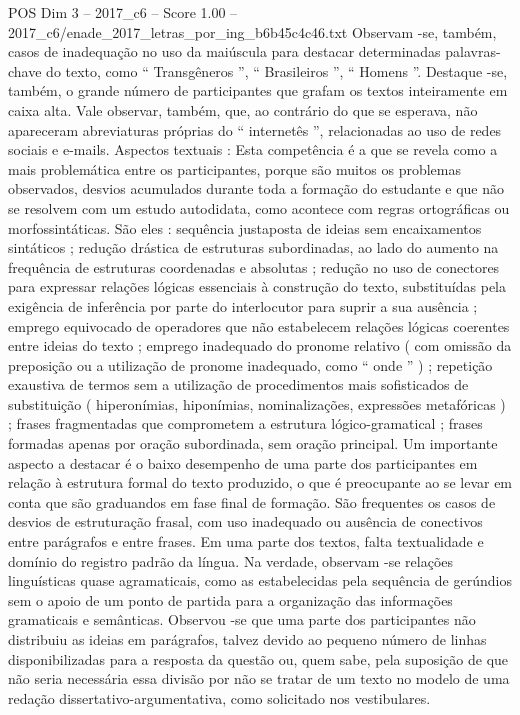 \begin{textsample}{POS Dim 3 – 2017\_c6 – Score 1.00 – 2017\_c6/enade\_2017\_letras\_por\_ing\_b6b45c4c46.txt}
Observam -se, também, casos de inadequação no uso da maiúscula para destacar determinadas palavras-chave do texto, como “ Transgêneros ”, “ Brasileiros ”, “ Homens ”.
Destaque -se, também, o grande número de participantes que grafam os textos inteiramente em caixa alta.
Vale observar, também, que, ao contrário do que se esperava, não apareceram abreviaturas próprias do “ internetês ”, relacionadas ao uso de redes sociais e e-mails.
Aspectos textuais : Esta competência é a que se revela como a mais problemática entre os participantes, porque são muitos os problemas observados, desvios acumulados durante toda a formação do estudante e que não se resolvem com um estudo autodidata, como acontece com regras ortográficas ou morfossintáticas.
São eles : sequência justaposta de ideias sem encaixamentos sintáticos ; redução drástica de estruturas subordinadas, ao lado do aumento na frequência de estruturas coordenadas e absolutas ; redução no uso de conectores para expressar relações lógicas essenciais à construção do texto, substituídas pela exigência de inferência por parte do interlocutor para suprir a sua ausência ; emprego equivocado de operadores que não estabelecem relações lógicas coerentes entre ideias do texto ; emprego inadequado do pronome relativo ( com omissão da preposição ou a utilização de pronome inadequado, como “ onde ” ) ; repetição exaustiva de termos sem a utilização de procedimentos mais sofisticados de substituição ( hiperonímias, hiponímias, nominalizações, expressões metafóricas ) ; frases fragmentadas que comprometem a estrutura lógico-gramatical ; frases formadas apenas por oração subordinada, sem oração principal.
Um importante aspecto a destacar é o baixo desempenho de uma parte dos participantes em relação à estrutura formal do texto produzido, o que é preocupante ao se levar em conta que são graduandos em fase final de formação.
São frequentes os casos de desvios de estruturação frasal, com uso inadequado ou ausência de conectivos entre parágrafos e entre frases.
Em uma parte dos textos, falta textualidade e domínio do registro padrão da língua.
Na verdade, observam -se relações linguísticas quase agramaticais, como as estabelecidas pela sequência de gerúndios sem o apoio de um ponto de partida para a organização das informações gramaticais e semânticas.
Observou -se que uma parte dos participantes não distribuiu as ideias em parágrafos, talvez devido ao pequeno número de linhas disponibilizadas para a resposta da questão ou, quem sabe, pela suposição de que não seria necessária essa divisão por não se tratar de um texto no modelo de uma redação dissertativo-argumentativa, como solicitado nos vestibulares.

\end{textsample}
